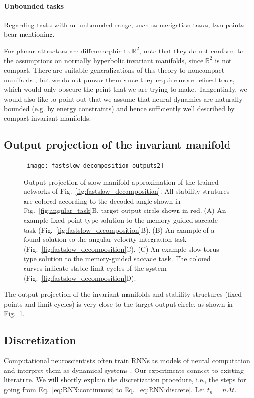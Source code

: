 \documentclass{article} %
\newcounter{ct}
\newcommand{\reals}{\mathbb{R}}
\theoremstyle{definition}
\theoremstyle{remark}
\begin{document}
\paragraph{Unbounded tasks}
Regarding tasks with an unbounded range, such as navigation tasks, two points bear mentioning.

For planar attractors are diffeomorphic to \(\reals^{2}\), note that they do not conform to the assumptions on normally hyperbolic invariant manifolds, since \(\reals^{2}\) is not compact.
There are suitable generalizations of this theory to noncompact manifolds \citep{eldering2013normally}, but we do not pursue them since they require more refined tools, which would only obscure the point that we are trying to make.
Tangentially, we would also like to point out that we assume that neural dynamics are naturally bounded (e.g. by energy constraints) and hence sufficiently well described by compact invariant manifolds.


\subsection{Output projection of the invariant manifold}

\begin{figure}[tbhp]
  \centering
  \texttt{[image: fastslow\_decomposition\_outputs2]}
  \caption{Output projection of slow manifold approximation of the trained networks of Fig.~\ref{fig:fastslow_decomposition}. All stability strutures are colored according to the decoded angle shown in Fig.~\ref{fig:angular_task}B, target output circle shown in red.
 (A) An example fixed-point type solution to the memory-guided saccade task (Fig.~\ref{fig:fastslow_decomposition}B).
 (B) An example of a found solution to the angular velocity integration task (Fig.~\ref{fig:fastslow_decomposition}C).
 (C) An example slow-torus type solution to the memory-guided saccade task. The colored curves indicate stable limit cycles of the system (Fig.~\ref{fig:fastslow_decomposition}D).
}\label{fig:fastslow_decomposition_otuput}
\end{figure}

The output projection of the invariant manifolds and stability structures (fixed points and limit cycles) is very close to the target output circle, as shown in Fig.~\ref{fig:fastslow_decomposition_otuput}.



\subsection{Discretization}\label{sec:discretization}
Computational neuroscientists often train RNNs as models of neural computation and interpret them as dynamical systems \citep{mante2013context,sussillo2013blackbox,xie2022neural}.
Our experiments connect to existing literature.
We will shortly explain the discretization procedure, i.e., the steps for going from Eq.~\ref{eq:RNN:continuous} to Eq.~\ref{eq:RNN:discrete}.
Let \(t_{n} = n \Delta t\).
\end{document}
